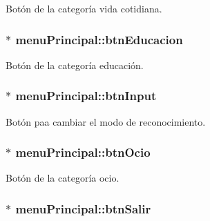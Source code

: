 Botón de la categoría vida cotidiana. 

\hypertarget{classmenu_principal_ab26a999803f322e9c9f05acd53125a8c}{}
\subsubsection[{btn\+Educacion}]{$\ast$ menu\+Principal\+::btn\+Educacion\hspace{0.3cm}{\ttfamily [private]}}\label{classmenu_principal_ab26a999803f322e9c9f05acd53125a8c}


Botón de la categoría educación. 

\hypertarget{classmenu_principal_aea487ca8d9e0d1df2fda6a563ca0f04c}{}
\subsubsection[{btn\+Input}]{$\ast$ menu\+Principal\+::btn\+Input}\label{classmenu_principal_aea487ca8d9e0d1df2fda6a563ca0f04c}


Botón paa cambiar el modo de reconocimiento. 

\hypertarget{classmenu_principal_a488846721d51f37a0ce23bb19372c0b1}{}
\subsubsection[{btn\+Ocio}]{$\ast$ menu\+Principal\+::btn\+Ocio\hspace{0.3cm}{\ttfamily [private]}}\label{classmenu_principal_a488846721d51f37a0ce23bb19372c0b1}


Botón de la categoría ocio. 

\hypertarget{classmenu_principal_a9415d04ae2ac0a7927c32c95acdcb9ca}{}
\subsubsection[{btn\+Salir}]{$\ast$ menu\+Principal\+::btn\+Salir\hspace{0.3cm}{\ttfamily [private]}}\label{classmenu_principal_a9415d04ae2ac0a7927c32c95acdcb9ca}


